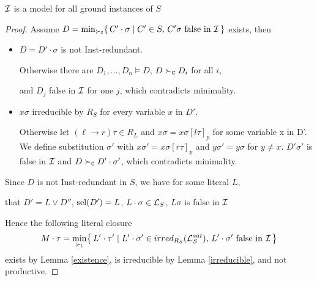         \begin{lemma}\label{lemma:model:is:candidate}
            $\mathcal{I}$ is a model for all ground instances of $S$
        \end{lemma}

        \begin{proof}
            Assume $
                D = \min_{\mathrel\succ_{\mathtt{C}}}\{\,
                C'\cdot\sigma \mid C'\in S,\,
                C'\sigma\text{ false in }\mathcal{I}\,
                \}
                $ exists, then

        \begin{itemize}
            \item $D = D'\cdot\sigma$ is not Inst-redundant.
            \vspace{0.2em}

            Otherwise there are
            $D_1,\ldots,D_n\models D$, $D\mathrel\succ_{\mathtt{C}} D_i$ for all $i$,

            and $D_j$ false in $\mathcal{I}$ for one $j$, which contradicts minimality.
            \hfill

            \item $x\sigma$ irreducible by $R_S$ for every variable $x$ in $D'$.
            \vspace{0.2em}

            Otherwise let $(\ell\to r)\tau\in R_L$ and $x\sigma = x\sigma[l\tau]_p$ for some variable x in D'.
            We define substitution $\sigma'$ with $x\sigma' = x\sigma[r\tau]_p$ and $y\sigma' = y\sigma$ for $y\neq x$.
            $D'\sigma'$ is false in $\mathcal{I}$ and $D\mathrel\succ_{\mathtt{C}} D'\cdot\sigma'$,
            which contradicts minimality.\hfill
        \end{itemize}

        Since $D$ is not Inst-redundant in $S$,
        we have for some literal $L$,

        that $D' = L\lor D''$, $\operatorname{sel}(D') = L$, $L\cdot\sigma\in\mathcal{L}_S$,
        $L\sigma$ is false in $\mathcal{I}$
        \vspace{0.7em}

        Hence the following literal closure
        \begin{gather*}
            M\cdot\tau = \min_{\mathrel\succ_{\mathtt{L}}}\!
    \left\{\,
        L'\cdot\tau' \mid
        L'\cdot\sigma' \in irred_{R_S}(\mathcal{L}_S^{sat}),\,
        L'\cdot\sigma'\text{ false in }\mathcal{I}\,
    \right\}
        \end{gather*}
        exists by Lemma \ref{existence}, is irreducible by Lemma \ref{irreducible},
        and not productive.


\end{proof}
